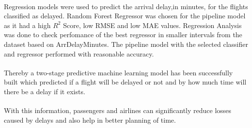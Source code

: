 \documentclass[12pt,letter-paper]{article}
\begin{document}
    \paragraph{}
    Regression models were used to predict the arrival delay,in minutes, for the flights classified as delayed. Random Forest Regressor was chosen for the pipeline model as it had a high $R^2$ Score, low RMSE and low MAE values. Regression Analysis was done to check perfomance of the best regressor in smaller intervals from the dataset based on ArrDelayMinutes. The pipeline model with the selected classifier and regressor performed with reasonable accuracy.
    
    \paragraph{}
    Thereby a two-stage predictive machine learning model has been successfully built which predicted if a flight will be delayed or not and by how much time will there be a delay if it exists. 
    
    \paragraph{}
    With this information, passengers and airlines can significantly reduce losses caused by delays and also help in better planning of time. 

    
\end{document}
